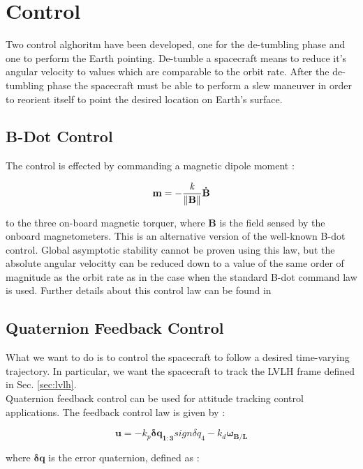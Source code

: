 \documentclass[11pt,a4paper]{report}
\begin{document}
\chapter{Control}
Two control alghoritm have been developed, one for the de-tumbling phase and one to perform the Earth pointing.
De-tumble a spacecraft means to reduce it's angular velocity to values which are comparable to the orbit rate.
After the de-tumbling phase the spacecraft must be able to perform a slew maneuver in order to reorient itself to point the desired location on Earth's surface.

\section{B-Dot Control}
The control is effected by commanding a magnetic dipole moment : 

\begin{equation}
 \mathbf{m} = - \frac{\mathit{k}}{\left\lVert\mathbf{B}\right\rVert}\mathbf{\dot{B}}
\end{equation}

to the three on-board magnetic torquer, where $\mathbf{B}$ is the field sensed by the onboard magnetometers. This is an alternative version of the well-known B-dot control. Global asymptotic stability cannot be proven using this law, but the absolute angular velocitty can be reduced down to a value of the same order of magnitude as the orbit rate as in the case when the standard B-dot command law is used. 
Further details about this control law can be found in \cite{Ref:Articles:Lovera}

\section{Quaternion Feedback Control}
What we want to do is to control the spacecraft to follow a desired time-varying trajectory. In particular, we want the spacecraft to track the LVLH frame defined in Sec. \ref{sec:lvlh}.\\
Quaternion feedback control can be used for attitude tracking control applications.
The feedback control law is given by :

\begin{equation}
\label{eq:idealcontrol}
 \mathbf{u} = -\mathit{k_p}\mathbf{\delta q_{1:3}}sign\mathit{\delta q_{4}} - \mathit{k_d}\mathbf{\omega_{B/L}}
\end{equation}

where $\mathbf{\delta q}$ is the error quaternion, defined as :
\end{document}
